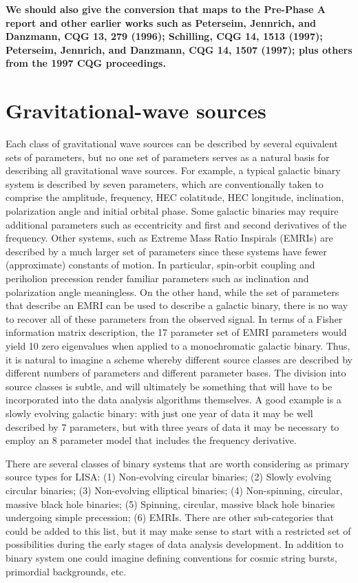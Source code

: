 \documentclass[11pt]{report}
\begin{document}
{\bf We should also give the conversion that maps to the Pre-Phase A report and other earlier works
such as Peterseim, Jennrich, and Danzmann, CQG 13, 279 (1996); Schilling, CQG 14, 1513 (1997);
Peterseim, Jennrich, and Danzmann, CQG 14, 1507 (1997); plus others from the 1997 CQG proceedings.}

\section{Gravitational-wave sources}
\label{sec:sources}

Each class of gravitational wave sources can be described by several equivalent sets of parameters, but no one
set of parameters serves as a natural basis for describing all gravitational wave sources. For example,
a typical galactic binary system is described by seven parameters, which are conventionally taken to
comprise the amplitude, frequency, HEC colatitude, HEC longitude, inclination, polarization angle and initial
orbital phase. Some galactic binaries may require additional parameters such as eccentricity and first and
second derivatives of the frequency. Other systems, such as Extreme Mass Ratio Inspirals (EMRIs) are described
by a much larger set of parameters since these systems have fewer (approximate) constants of motion. In particular,
spin-orbit coupling and periholion precession render familiar parameters such as inclination and polarization
angle meaningless. On the other hand, while the set of parameters that describe an EMRI can be used to
describe a galactic binary, there is no way to recover all of these parameters from the observed signal. In terms of
a Fisher information matrix description, the 17 parameter set of EMRI parameters would yield 10 zero eigenvalues
when applied to a monochromatic galactic binary. Thus, it is natural to imagine a scheme whereby different source
classes are described by different numbers of parameters and different parameter bases. The division into source
classes is subtle, and will ultimately be something that will have to be incorporated into the data analysis algorithms
themselves. A good example is a slowly evolving galactic binary: with just one year of data it may be well
described by 7 parameters, but with three years of data it may be necessary to employ an 8 parameter model
that includes the frequency derivative.

There are several classes of binary systems that are worth considering as primary source types for
LISA: (1) Non-evolving circular binaries; (2) Slowly evolving circular binaries; (3) Non-evolving elliptical
binaries; (4) Non-spinning, circular, massive black hole binaries; (5) Spinning, circular, massive black hole
binaries undergoing simple precession; (6) EMRIs. There are other sub-categories that could be added to
this list, but it may make sense to start with a restricted set of possibilities during the early stages
of data analysis development. In addition to binary system one could imagine defining conventions for
cosmic string bursts, primordial backgrounds, etc.
\end{document}
